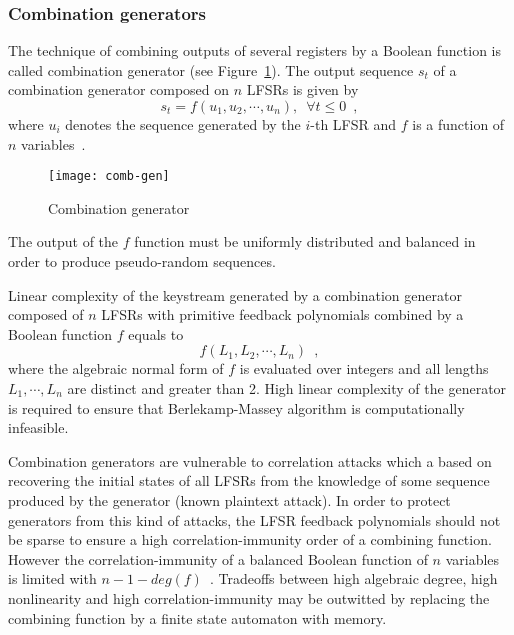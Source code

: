 \subsubsection{Combination generators} 
The technique of combining outputs of several
registers by a Boolean function is called combination generator (see
Figure~\ref{fig:comb-gen}). The output sequence $s_t$ of a combination generator
composed on $n$ LFSRs is given by
\begin{equation}
    \label{eqn:comb-gen-seq}
    s_t = f(u_1, u_2, \cdots, u_n), \enspace \forall t \leq 0 \enspace, 
\end{equation}
where $u_i$ denotes the sequence generated by the $i$-th LFSR and $f$ is a
function of $n$ variables~\cite{encyclopedia_of_cryptography}.
\begin{figure}[htbp]
    \centering
    \texttt{[image: comb-gen]}
    \caption{Combination generator}
    \label{fig:comb-gen}
\end{figure}
The output of the $f$ function must be uniformly distributed and balanced in
order to produce pseudo-random sequences.

Linear complexity of the keystream generated by a combination generator composed
of $n$ LFSRs with primitive feedback polynomials combined by a Boolean function
$f$ equals to 
\begin{equation}
    \label{eqn:lin-complexity}
    f(L_1, L_2, \cdots, L_n) \enspace, 
\end{equation}
where the algebraic normal form of $f$ is evaluated over
integers and all lengths $L_1, \cdots, L_n$ are distinct and greater than 2.
High linear complexity of the generator is required to ensure that
Berlekamp-Massey algorithm is computationally infeasible.

Combination generators are vulnerable to correlation attacks which a based on 
recovering the initial states of all LFSRs from the knowledge of some sequence
produced by the generator (known plaintext attack). In order to protect
generators from this kind of attacks, the LFSR feedback polynomials should not
be sparse to ensure a high correlation-immunity order of a combining function.
However the correlation-immunity of a balanced Boolean function of $n$ variables
is limited with $n - 1 - deg(f)$~\cite{encyclopedia_of_cryptography}. Tradeoffs
between high algebraic degree,  high nonlinearity and high correlation-immunity
may be outwitted by replacing the combining function by a finite state automaton
with memory.

